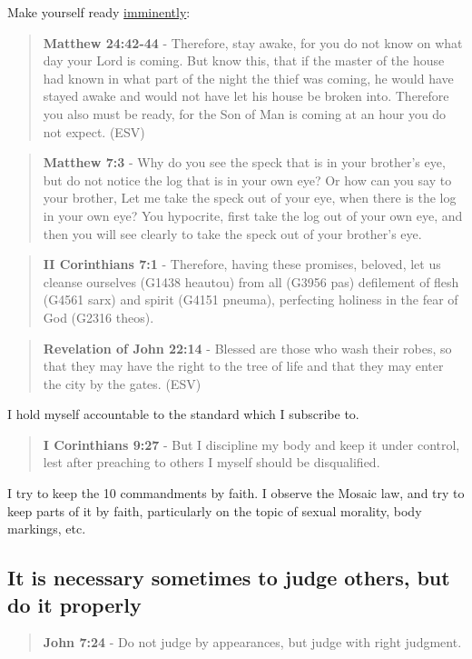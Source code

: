 \documentclass[11pt]{article}
\begin{document}
Make yourself ready \uline{imminently}:

\begin{quote}
\textbf{Matthew 24:42-44} - Therefore, stay awake, for you do not know on what day your Lord is coming. But know this, that if the master of the house had known in what part of the night the thief was coming, he would have stayed awake and would not have let his house be broken into. Therefore you also must be ready, for the Son of Man is coming at an hour you do not expect. (ESV)
\end{quote}

\begin{quote}
\textbf{Matthew 7:3} - Why do you see the speck that is in your brother's eye, but do not notice the log that is in your own eye?  Or how can you say to your brother, Let me take the speck out of your eye, when there is the log in your own eye?  You hypocrite, first take the log out of your own eye, and then you will see clearly to take the speck out of your brother's eye.
\end{quote}

\begin{quote}
\textbf{II Corinthians 7:1} - Therefore, having these promises, beloved, let us cleanse ourselves (G1438 heautou) from all (G3956 pas) defilement of flesh (G4561 sarx) and spirit (G4151 pneuma), perfecting holiness in the fear of God (G2316 theos).
\end{quote}

\begin{quote}
\textbf{Revelation of John 22:14} - Blessed are those who wash their robes, so that they may have the right to the tree of life and that they may enter the city by the gates. (ESV)
\end{quote}

I hold myself accountable to the standard which I subscribe to.

\begin{quote}
\textbf{I Corinthians 9:27} - But I discipline my body and keep it under control, lest after preaching to others I myself should be disqualified.
\end{quote}

I try to keep the 10 commandments by faith.
I observe the Mosaic law, and try to keep parts of it by faith, particularly
on the topic of sexual morality, body markings, etc.

\subsection{It is necessary sometimes to judge others, but do it properly}
\label{sec:org1c5ce67}
\begin{quote}
\textbf{John 7:24} - Do not judge by appearances, but judge with right judgment.
\end{quote}
\end{document}
